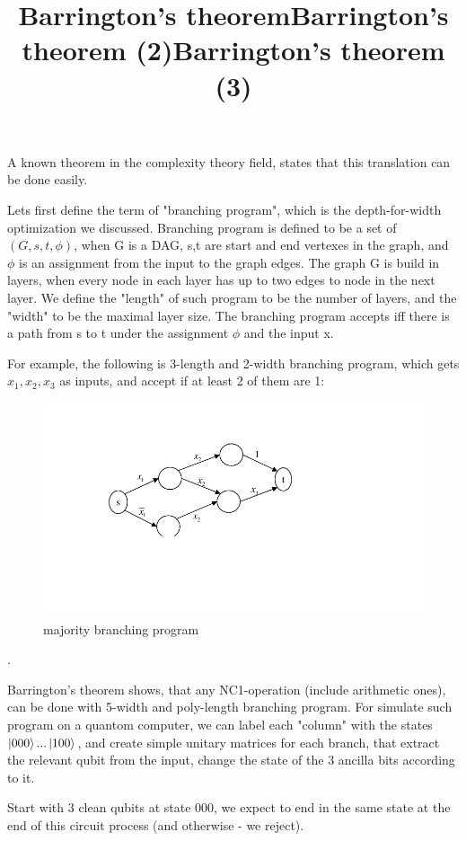 \documentclass{article}
\begin{document}
A known theorem in the complexity theory field, states that this translation can be done easily. 



\title{Barrington's theorem}
Lets first define the term of "branching program", which is the depth-for-width optimization we discussed. Branching program is defined to be a set of $(G,s,t,\phi)$, when G is a DAG, s,t are start and end vertexes in the graph, and $\phi$ is an assignment from the input to the graph edges. The graph G is build in layers, when every node in each layer has up to two edges to node in the next layer. We define the "length" of such program to be the number of layers, and the "width" to be the maximal layer size. The branching program accepts iff there is a path from s to t under the assignment $\phi$ and the input x. 


\title{Barrington's theorem (2)}
For example, the following is 3-length and 2-width branching program, which gets $x_{1},x_{2},x_{3}$ as inputs, and accept if at least 2 of them are 1:
\begin{figure}
\includegraphics[scale=0.5]{majority} 
\caption{majority branching program}
\end{figure}.


\title{Barrington's theorem (3)}
Barrington's theorem shows, that any NC1-operation (include arithmetic ones), can be done with 5-width and poly-length branching program. For simulate such program on a quantom computer, we can label each "column" with the states $\left\vert{000}\right\rangle...\left\vert{100}\right\rangle$, and create simple unitary matrices for each branch, that extract the relevant qubit from the input, change the state of the 3 ancilla bits according to it. 

Start with 3 clean qubits at state 000, we expect to end in the same state at the end of this circuit process (and otherwise - we reject).
\end{document}
